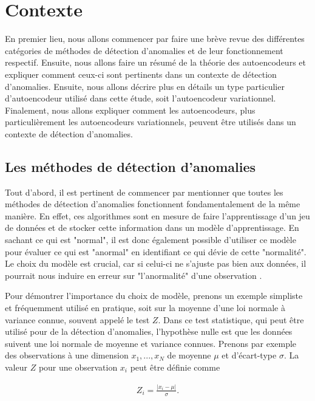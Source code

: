 \chapter{Contexte}     %
\label{chap:background}                   %

En premier lieu, nous allons commencer par faire une brève revue des différentes catégories  de méthodes de détection d'anomalies et de leur fonctionnement respectif. Ensuite, nous allons faire un résumé de la théorie des autoencodeurs et expliquer comment ceux-ci sont pertinents dans un contexte de détection d'anomalies. Ensuite, nous allons décrire plus en détails un type particulier d'autoencodeur utilisé dans cette étude, soit l'autoencodeur variationnel. Finalement, nous allons expliquer comment les autoencodeurs, plus particulièrement les autoencodeurs variationnels, peuvent être utilisés dans un contexte de détection d'anomalies.

\section{Les méthodes de détection d'anomalies}

Tout d'abord, il est pertinent de commencer par mentionner que toutes les méthodes de détection d'anomalies fonctionnent fondamentalement de la même manière. En effet, ces algorithmes sont en mesure de faire l'apprentissage d'un jeu de données et de stocker cette information dans un modèle d'apprentissage. En sachant ce qui est "normal", il est donc également possible d'utiliser ce modèle pour évaluer ce qui est "anormal" en identifiant ce qui dévie de cette "normalité". Le choix du modèle est crucial, car si celui-ci ne s'ajuste pas bien aux données, il pourrait nous induire en erreur sur "l'anormalité" d'une observation \citep{10.5555/3086742}. 

Pour démontrer l'importance du choix de modèle, prenons un exemple simpliste et fréquemment utilisé en pratique, soit sur la moyenne d'une loi normale à variance connue, souvent appelé le test $Z$. Dans ce test statistique, qui peut être utilisé pour de la détection d'anomalies, l'hypothèse nulle est que les données suivent une loi normale de moyenne et variance connues. Prenons par exemple des observations à une dimension $x_1, ..., x_N$ de moyenne $\mu$ et d'écart-type $\sigma$. La valeur $Z$ pour une observation $x_i$ peut être définie comme

\begin{gather}
Z_i = \frac{|x_i-\mu|}{\sigma}.
\end{gather}

